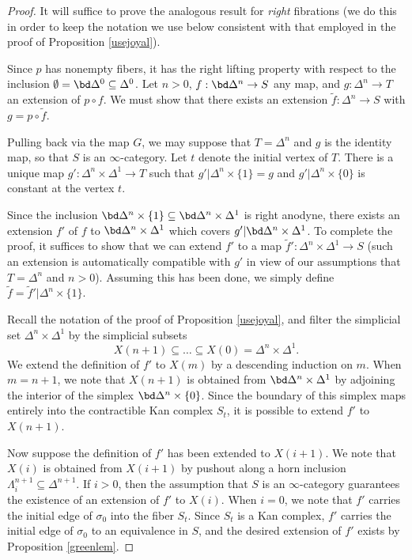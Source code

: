 \begin{proof}
It will suffice to prove the analogous result for {\em right} fibrations (we do this in order to keep the notation we use below consistent with that employed in the proof of Proposition \ref{usejoyal}).

Since $p$ has nonempty fibers, it has the right lifting property with respect to the inclusion
$\emptyset = \bd \Delta^0 \subseteq \Delta^0$. Let $n > 0$, $f: \bd \Delta^n \rightarrow S$ any map, and $g: \Delta^n \rightarrow T$ an extension of $p \circ f$. We must show that there exists an extension $\widetilde{f}: \Delta^n \rightarrow S$ with $g = p \circ \widetilde{f}$.

Pulling back via the map $G$, we may suppose that $T = \Delta^n$ and $g$ is the identity map, so that $S$ is an $\infty$-category. Let $t$ denote the initial vertex of $T$. There is a unique map
$g': \Delta^n \times \Delta^1 \rightarrow T$ such that $g' | \Delta^n \times \{1\} = g$ and
$g' | \Delta^n \times \{0\}$ is constant at the vertex $t$.

Since the inclusion $\bd \Delta^n \times \{1\} \subseteq \bd \Delta^n \times \Delta^1$ is right anodyne, there exists an extension $f'$ of $f$ to $\bd \Delta^n \times \Delta^1$ which covers $g' | \bd \Delta^n \times \Delta^1$. To complete the proof, it suffices to show that we can extend $f'$ to a map $\widetilde{f}': \Delta^n \times \Delta^1 \rightarrow S$ (such an extension is automatically compatible with $g'$ in view of our assumptions that $T = \Delta^n$ and $n > 0$). Assuming this has been done, we simply define
$\widetilde{f} = \widetilde{f}' | \Delta^n \times \{1\}$.

Recall the notation of the proof of Proposition \ref{usejoyal}, and filter the simplicial set
$\Delta^n \times \Delta^1$ by the simplicial subsets
$$ X(n+1) \subseteq \ldots \subseteq X(0) = \Delta^n \times \Delta^1.$$
We extend the definition of $f'$ to $X(m)$ by a descending induction on $m$. When $m=n+1$, we note that $X(n+1)$ is obtained from $\bd \Delta^n \times \Delta^1$ by adjoining the interior of the simplex 
$ \bd \Delta^n \times \{0 \}$. Since the boundary of this simplex maps entirely into the contractible Kan complex $S_{t}$, it is possible to extend $f'$ to $X(n+1)$.

Now suppose the definition of $f'$ has been extended to $X(i+1)$. We note that $X(i)$ is obtained from $X(i+1)$ by pushout along a horn inclusion $\Lambda^{n+1}_i \subseteq \Delta^{n+1}$. If $i > 0$, then the assumption that $S$ is an $\infty$-category guarantees the existence of an extension of $f'$ to $X(i)$. When $i =0$, we note that $f'$ carries the initial edge of $\sigma_0$ into the fiber $S_{t}$. Since $S_{t}$ is a Kan complex, $f'$ carries the initial edge of $\sigma_0$ to an equivalence in $S$, and the desired extension of $f'$ exists by Proposition \ref{greenlem}.
\end{proof}


